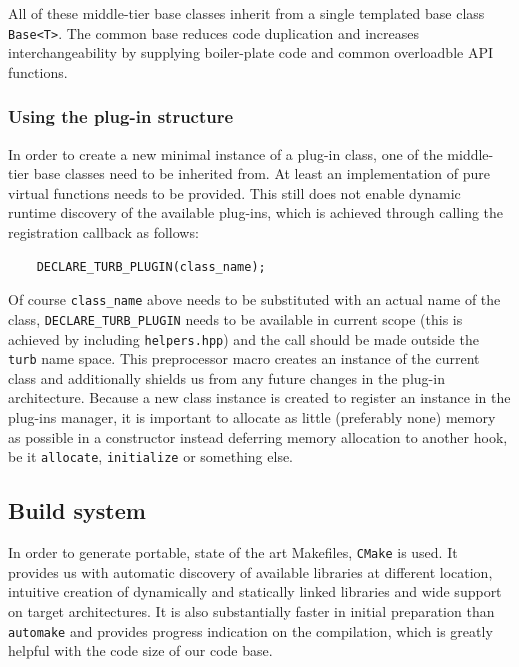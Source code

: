 \documentclass[11pt,a4paper]{article}
\begin{document}
\begin{appendices}
    All of these middle-tier base classes inherit from a single templated base class \texttt{Base<T>}.
    The common base reduces code duplication and increases interchangeability by supplying boiler-plate code and common overloadble API functions.
    
    \subsubsection{Using the plug-in structure}
    In order to create a new minimal instance of a plug-in class, one of the middle-tier base classes need to be inherited from.
    At least an implementation of pure virtual functions needs to be provided.
    This still does not enable dynamic runtime discovery of the available plug-ins, which is achieved through calling the registration callback as follows:

    \begin{verbatim}
    DECLARE_TURB_PLUGIN(class_name);
    \end{verbatim}

    Of course \texttt{class\_name} above needs to be substituted with an actual name of the class, \texttt{DECLARE\_TURB\_PLUGIN} needs to be available in current scope (this is achieved by including \texttt{helpers.hpp}) and the call should be made outside the \texttt{turb} name space.
    This preprocessor macro creates an instance of the current class and additionally shields us from any future changes in the plug-in architecture.
    Because a new class instance is created to register an instance in the plug-ins manager, it is important to allocate as little (preferably none) memory as possible in a constructor instead deferring memory allocation to another hook, be it \texttt{allocate}, \texttt{initialize} or something else.

    \subsection{Build system}
    In order to generate portable, state of the art Makefiles, \texttt{CMake} is used.
    It provides us with automatic discovery of available libraries at different location, intuitive creation of dynamically and statically linked libraries and wide support on target architectures.
    It is also substantially faster in initial preparation than \texttt{automake} and provides progress indication on the compilation, which is greatly helpful with the code size of our code base.


\end{appendices}
\end{document}
